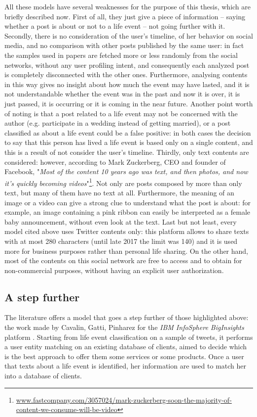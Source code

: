 All these models have several weaknesses for the purpose of this thesis, which are briefly described now. First of all, they just give a piece of information -- saying whether a post is about or not to a life event -- not going further with it. Secondly, there is no consideration of the user's timeline, of her behavior on social media, and no comparison with other posts published by the same user: in fact the samples used in papers are fetched more or less randomly from the social networks, without any user profiling intent, and consequently each analyzed post is completely disconnected with the other ones. Furthermore, analysing contents in this way gives no insight about how much the event may have lasted, and it is not understandable whether the event was in the past and now it is over, it is just passed, it is occurring or it is coming in the near future. Another point worth of noting is that a post related to a life event may not be concerned with the author (e.g. participate in a wedding instead of getting married), or a post classified as about a life event could be a false positive: in both cases the decision to say that this person has lived a life event is based only on a single content, and this is a result of not consider the user's timeline. Thirdly, only text contents are considered: however, according to Mark Zuckerberg, CEO and founder of Facebook, "\textit{Most of the content 10 years ago was text, and then photos, and now it's quickly becoming videos}"\footnote{\url{www.fastcompany.com/3057024/mark-zuckerberg-soon-the-majority-of-content-we-consume-will-be-video}}. Not only are posts composed by more than only text, but many of them have no text at all. Furthermore, the meaning of an image or a video can give a strong clue to understand what the post is about: for example, an image containing a pink ribbon can easily be interpreted as a female baby announcement, without even look at the text. Last but not least, every model cited above uses Twitter contents only: this platform allows to share texts with at most 280 characters (until late 2017 the limit was 140) and it is used more for business purposes rather than personal life sharing. On the other hand, most of the contents on this social network are free to access and to obtain for non-commercial purposes, without having an explicit user authorization.

\subsection{A step further}
The literature offers a model that goes a step further of those highlighted above: the work made by Cavalin, Gatti, Pinharez for the \emph{IBM InfoSphere BigInsights} platform \cite{cavalin2014towards}. Starting from life event classification on a sample of tweets, it performs a user entity matching on an existing database of clients, aimed to decide which is the best approach to offer them some services or some products. Once a user that texts about a life event is identified, her information are used to match her into a database of clients.

